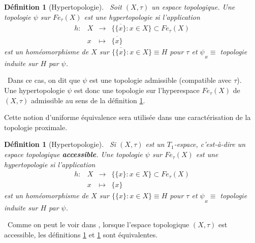\documentclass[11pt]{report}
\newenvironment{boxdefinition}
{\begin{tcolorbox}
		[enhanced jigsaw,breakable,pad at break*=1mm,
		colback=black!5!white,boxrule=0pt,frame hidden,
		borderline west={1.5mm}{-2mm}{blue}]}
	{\end{tcolorbox}}
\theoremstyle{styletheorem}
\theoremstyle{styledef}
\newtheorem{definitions}[theoreme]{Définition}
\theoremstyle{remark}
\newenvironment{definition}{\vspace*{0.3cm}\begin{boxdefinition}\begin{definitions}}{\end{definitions}\end{boxdefinition}\vspace*{0.3cm}}
\newcommand{\ie}{c'est-à-dire }
\newcommand*\closure[1]{\ensuremath{\overline{#1}}}
\begin{document}
\begin{definition}[Hypertopologie]\label{d1}\ 
	Soit $(X,\tau)$ un espace topologique. Une topologie $\psi$ sur $Fe_{\tau} (X)$ est une hypertopologie si l'application 
	$$ \begin{array}{rccl}
		h : & X & \longrightarrow & \lbrace \closure{\lbrace x \rbrace} : x \in X \rbrace  \subset Fe_{\tau} (X) \\
		& x & \longmapsto & \closure{\lbrace x\rbrace}
	\end{array} $$
	est un homéomorphisme de $X$ sur $ \lbrace \closure{\lbrace x \rbrace} : x \in X \rbrace \equiv H$ pour $ \tau$ et $ \psi_{_{H}} \equiv$ topologie induite sur $H$ par $ \psi $.
\end{definition}\ 
Dans ce cas, on dit que $\psi$ est une topologie admissible (compatible avec $\tau$).\\
Une hypertopologie $\psi$ est donc une topologie sur l'hyperespace $Fe_{\tau} (X)$ de $(X,\tau)$ admissible au sens de la définition \ref{d1}.

Cette notion d'uniforme équivalence sera utilisée dans une caractérisation de la topologie proximale.	
\begin{definition}[Hypertopologie]\label{d2}\  
	Si $ (X,\tau) $ est un $T_1$-espace, \ie un espace topologique \textbf{accessible}.
	Une topologie $\psi$ sur $ Fe_{\tau}(X) $ est une hypertopologie si l'application 
	$$ \begin{array}{rccl}
		h : & X & \longrightarrow & \lbrace\lbrace x \rbrace : x \in X \rbrace  \subset Fe_{\tau} (X) \\
		& x & \longmapsto & \lbrace x\rbrace
	\end{array} $$
	est un homéomorphisme de $X$ sur $ \lbrace \lbrace x \rbrace : x \in X \rbrace \equiv H$ pour $ \tau$ et $ \psi_{_{H}} \equiv$ topologie induite sur $H$ par $ \psi $.
\end{definition}\ 
Comme on peut le voir dans \cite{b7}, lorsque l'espace topologique $(X,\tau)$ est accessible, les définitions \ref{d1} et \ref{d2} sont équivalentes.
\end{document}
